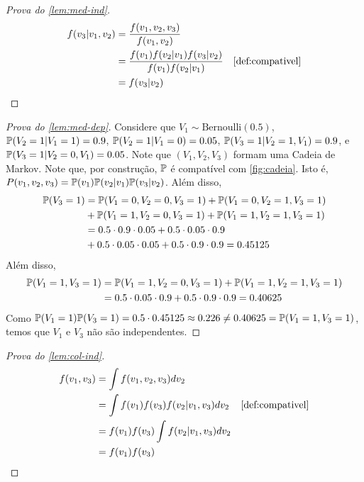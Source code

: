 \begin{proof}[Prova do \cref{lem:med-ind}]
 \begin{align*}
  f(v_3|v_1,v_2) 
  &= \frac{f(v_1,v_2,v_3)}{f(v_1,v_2)} \\
  &= \frac{f(v_1)f(v_2|v_1)f(v_3|v_2)}{f(v_1)f(v_2|v_1)} 
  & \text{\cref{def:compativel}} \\
  &= f(v_3|v_2)
 \end{align*}
\end{proof}

\begin{proof}[Prova do \cref{lem:med-dep}]
 Considere que $V_1 \sim \text{Bernoulli}(0.5)$,
 $\P(V_2=1|V_1=1)=0.9$, $\P(V_2=1|V_1=0)=0.05$,
 $\P(V_3=1|V_2=1,V_1)=0.9$, e $\P(V_3=1|V_2=0,V_1)=0.05$.
 Note que $(V_1,V_2,V_3)$ formam uma Cadeia de Markov.
 Note que, por construção, $\P$ é 
 compatível com \cref{fig:cadeia}.
 Isto é, $P(v_1,v_2,v_3) = \P(v_1)\P(v_2|v_1)\P(v_3|v_2)$.
 Além disso,
 \begin{align*}
  \P(V_3 = 1) &= \P(V_1=0, V_2=0, V_3=1) + \P(V_1=0, V_2=1, V_3=1) \\
              &+ \P(V_1=1, V_2=0, V_3=1) + \P(V_1=1, V_2=1, V_3=1) \\
              &= 0.5 \cdot 0.9 \cdot 0.05 + 0.5 \cdot 0.05 \cdot 0.9 \\
              &+ 0.5 \cdot 0.05 \cdot 0.05 + 0.5 \cdot 0.9 \cdot 0.9 
              = 0.45125
 \end{align*}
 Além disso,
 \begin{align*}
  \P(V_1 = 1, V_3 = 1)
  &= \P(V_1 = 1, V_2 = 0, V_3 = 1) 
  +  \P(V_1 = 1, V_2 = 1, V_3 = 1) \\
  &= 0.5 \cdot 0.05 \cdot 0.9 + 0.5 \cdot 0.9 \cdot 0.9
  = 0.40625
 \end{align*}
 Como $\P(V_1=1)\P(V_3=1) = 0.5 \cdot 0.45125 \approx 0.226 \neq 
 0.40625 = \P(V_1=1,V_3=1)$,
 temos que $V_1$ e $V_3$ não são independentes.
\end{proof}

\begin{proof}[Prova do \cref{lem:col-ind}]
 \begin{align*}
  f(v_1,v_3) 
  &= \int f(v_1, v_2, v_3) dv_2 \\
  &= \int f(v_1)f(v_3)f(v_2|v_1,v_3) dv_2 
  & \text{\cref{def:compativel}} \\
  &= f(v_1)f(v_3) \int f(v_2|v_1,v_3) dv_2 \\
  &= f(v_1)f(v_3)
 \end{align*}
\end{proof}

